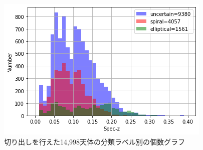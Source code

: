 \documentclass[a4j, 11pt]{jreport}
\begin{document}
\begin{figure}[H]
 \centering
 \includegraphics[width=1\hsize]{images/z_15000_0_040_kesson.png}
 \caption{切り出しを行えた14,998天体の分類ラベル別の個数グラフ}
 \label{fig:z_15000}
\end{figure}
\end{document}

